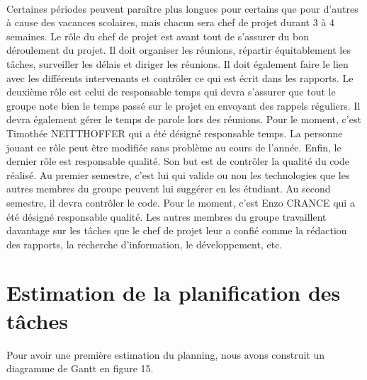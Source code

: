 \paragraph{}
Certaines périodes peuvent paraître plus longues pour certains que pour d’autres à cause des vacances
scolaires, mais chacun sera chef de projet durant 3 à 4 semaines. Le rôle du chef de projet est
avant tout de s’assurer du bon déroulement du projet. Il doit organiser les réunions, répartir équitablement
les tâches, surveiller les délais et diriger les réunions. Il doit également faire le lien avec les
différents intervenants et contrôler ce qui est écrit dans les rapports. Le deuxième rôle est celui de
responsable temps qui devra s’assurer que tout le groupe note bien le temps passé sur le projet en envoyant
des rappels réguliers. Il devra également gérer le temps de parole lors des réunions. Pour le moment,
c’est Timothée NEITTHOFFER qui a été désigné responsable temps. La personne jouant ce rôle peut être
modifiée sans problème au cours de l’année. Enfin, le dernier rôle est responsable qualité. Son but est de
contrôler la qualité du code réalisé. Au premier semestre, c’est lui qui valide ou non les technologies que les
autres membres du groupe peuvent lui suggérer en les étudiant. Au second semestre, il devra contrôler le code.
Pour le moment, c’est Enzo CRANCE qui a été désigné responsable qualité. Les autres membres du groupe travaillent
davantage sur les tâches que le chef de projet leur a confié comme la rédaction des rapports, la
recherche d’information, le développement, etc.

\section{Estimation de la planification des tâches}

Pour avoir une première estimation du planning, nous avons construit un diagramme de Gantt en figure 15.

